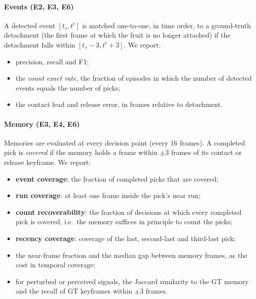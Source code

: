 \paragraph{Events (E2, E3, E6)} A detected event $[t_s, t^{\mathrm{r}}]$ is matched one-to-one, in time order, to a ground-truth detachment (the first frame at which the fruit is no longer attached) if the detachment falls within $[t_s-3, t^{\mathrm{r}}+3]$. We report:
\begin{itemize}
\item precision, recall and F1;
\item the \emph{count exact rate}, the fraction of episodes in which the number of detected events equals the number of picks;
\item the contact lead and release error, in frames relative to detachment.
\end{itemize}

\paragraph{Memory (E3, E4, E6)} Memories are evaluated at every decision point (every 16 frames). A completed pick is \emph{covered} if the memory holds a frame within $\pm 3$ frames of its contact or release keyframe. We report:
\begin{itemize}
\item \textbf{event coverage}: the fraction of completed picks that are covered;
\item \textbf{run coverage}: at least one frame inside the pick's near run;
\item \textbf{count recoverability}: the fraction of decisions at which every completed pick is covered, i.e.\ the memory suffices in principle to count the picks;
\item \textbf{recency coverage}: coverage of the last, second-last and third-last pick;
\item the near-frame fraction and the median gap between memory frames, as the cost in temporal coverage;
\item for perturbed or perceived signals, the Jaccard similarity to the GT memory and the recall of GT keyframes within $\pm3$ frames.
\end{itemize}

